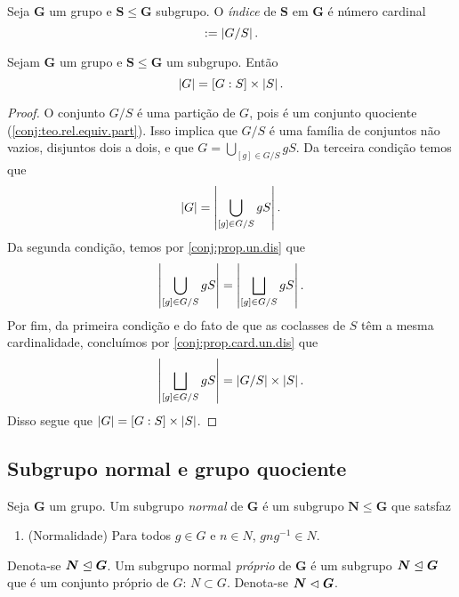 \begin{definition}
Seja $\bm G$ um grupo e $\bm S \leq \bm G$ subgrupo. O \emph{índice} de $\bm S$ em $\bm G$ é número cardinal
	\begin{equation*}
	[G : S] := \card{G/S}.
	\end{equation*}
\end{definition}

\begin{proposition}
Sejam $\bm G$ um grupo e $\bm S \leq \bm G$ um subgrupo. Então
	\begin{equation*}
	\left\lvert{G}\right\rvert=[G:S] \times \left\lvert{S}\right\rvert.
	\end{equation*}
\end{proposition}
\begin{proof}
O conjunto $G/S$ é uma partição de $G$, pois é um conjunto quociente (\ref{conj:teo.rel.equiv.part}). Isso implica que $G/S$ é uma família de conjuntos não vazios, disjuntos dois a dois, e que $G = \bigcup_{[g] \in G/S} gS$. Da terceira condição temos que
	\begin{equation*}
	\left\lvert{G}\right\rvert = \left\lvert{\bigcup_{[g] \in G/S} gS}\right\rvert.
	\end{equation*}
Da segunda condição, temos por \ref{conj:prop.un.dis} que
	\begin{equation*}
	\left\lvert{\bigcup_{[g] \in G/S} gS}\right\rvert = \left\lvert{\bigsqcup_{[g] \in G/S} gS}\right\rvert.
	\end{equation*}
Por fim, da primeira condição e do fato de que as coclasses de $S$ têm a mesma cardinalidade, concluímos por \ref{conj:prop.card.un.dis} que
	\begin{equation*}
	\left\lvert{\bigsqcup_{[g] \in G/S} gS}\right\rvert = \left\lvert{G/S}\right\rvert \times \left\lvert{S}\right\rvert.
	\end{equation*}
Disso segue que $\left\lvert{G}\right\rvert=[G:S] \times \left\lvert{S}\right\rvert$.
\end{proof}

\subsection{Subgrupo normal e grupo quociente}

\begin{definition}
Seja $\bm G$ um grupo. Um subgrupo \emph{normal} de $\bm G$ é um subgrupo $\bm N \leq \bm G$ que satsfaz
	\begin{enumerate}[label={SGN\arabic*.}]
	\item \label{SGN} (Normalidade) Para todos $g \in G$ e $n \in N$, $gng^{-1} \in N$.
	\end{enumerate}
\noindent
Denota-se $\bm N \mathrel{\unlhd} \bm G$. Um subgrupo normal \emph{próprio} de $\bm G$ é um subgrupo $\bm N \mathrel{\unlhd} \bm G$ que é um conjunto próprio de $G$: $N \subset G$. Denota-se $\bm N \mathrel{\lhd} \bm G$.
\end{definition}

